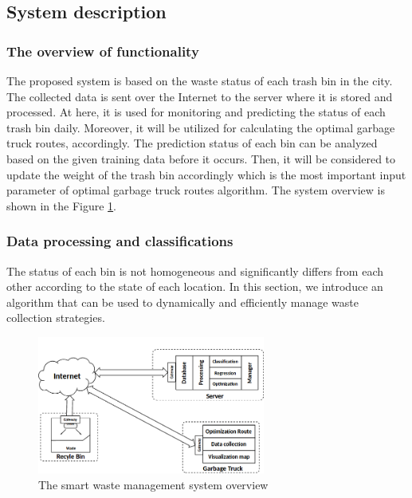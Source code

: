\documentclass[conference]{IEEEtran}
\begin{document}
\subsection{System description}
\label{systemdesciption}
\subsubsection{The overview of functionality}


The proposed system is based on the waste status of each trash bin in the city. The collected data is sent over the Internet to the server where it is stored and processed. At here, it is used for monitoring and predicting the status of each trash bin daily. Moreover, it will be utilized for calculating the optimal garbage truck routes, accordingly. The prediction status of each bin can be analyzed based on the given training data before it occurs. Then, it will be considered to update the weight of the trash bin accordingly which is the most important input parameter of optimal garbage truck routes algorithm. The system overview is shown in the Figure \ref{fig2}.


\subsubsection{Data processing and classifications}


The status of each bin is not homogeneous and significantly differs from each other according to the state of each location. In this section, we introduce an algorithm that can be used to dynamically and efficiently manage waste collection strategies.
\begin{figure}
	\centering
	\includegraphics[width=7.5cm]{Model1-2}
	\caption{The smart waste management system overview}
	\label{fig2}
\end{figure}
\end{document}
